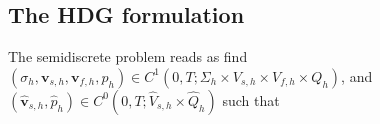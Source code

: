 \documentclass[10pt,letterpaper]{amsart}
\theoremstyle{plain} %
\theoremstyle{remark} %
\newcommand{\vect}[1]{\mathbf{#1}}
\begin{document}
\subsection{The HDG formulation}\label{ss:HDGformulation}
The semidiscrete problem reads as find $(\sigma_{h}, \vect{v}_{s,h}, \vect{v}_{f,h}, p_{h}) \in C^1(0,T; \Sigma_{h} \times V_{s,h} \times V_{f,h} \times Q_{h} )$, and $(\widehat{\vect{v}}_{s,h}, \widehat{p}_{h}) \in C^0(0,T;  \widehat{V}_{s,h}\times \widehat{Q}_{h})$
%
%
such that 
%
\end{document}

